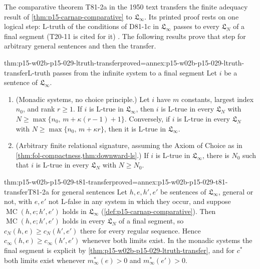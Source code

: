 The comparative theorem T81-2a in the 1950 text transfers the finite
adequacy result of \cref{thm:p15-carnap-comparative} to
\(\mathfrak L_\infty\). Its printed proof rests on one logical step:
L-truth of the conditions of D81-1c in \(\mathfrak L_\infty\) passes to
every \(\mathfrak L_N\) of a final segment (T20-11 is cited for it)
\cite[sec.~81, pp.~440--441]{Carnap1950Probability}. The following
results prove that step for arbitrary general sentences and then the
transfer.

\begin{hbtheorem}{thm:p15-w02b-p15-029-ltruth-transfer}{proved=annex:p15-w02b-p15-029-ltruth-transfer}{L-truth passes from the infinite system to a final segment}
Let \(i\) be a sentence of \(\mathfrak L_\infty\).
\begin{enumerate}
 \item (Monadic systems, no choice principle.) Let \(i\) have
       \(m\) constants, largest index \(n_0\), and rank \(r\geq1\).
       If \(i\) is L-true in \(\mathfrak L_\infty\), then \(i\) is
       L-true in every \(\mathfrak L_N\) with
       \(N\geq\max\{n_0,\,m+\kappa(r-1)+1\}\). Conversely, if
       \(i\) is L-true in every \(\mathfrak L_N\) with
       \(N\geq\max\{n_0,\,m+\kappa r\}\), then it is L-true in
       \(\mathfrak L_\infty\).
 \item (Arbitrary finite relational signature, assuming the Axiom of
       Choice as in \cref{thm:fol-compactness,thm:downward-ls}.)
       If \(i\) is L-true in \(\mathfrak L_\infty\), there is
       \(N_0\) such that \(i\) is L-true in every
       \(\mathfrak L_N\) with \(N\geq N_0\).
\end{enumerate}
\end{hbtheorem}

\begin{hbtheorem}{thm:p15-w02b-p15-029-t81-transfer}{proved=annex:p15-w02b-p15-029-t81-transfer}{T81-2a for general sentences}
Let \(h,e,h',e'\) be sentences of \(\mathfrak L_\infty\), general or
not, with \(e,e'\) not L-false in any system in which they occur, and
suppose \(\operatorname{MC}(h,e;h',e')\) holds in
\(\mathfrak L_\infty\) (\cref{def:p15-carnap-comparative}). Then
\(\operatorname{MC}(h,e;h',e')\) holds in every \(\mathfrak L_N\)
of a final segment, so \(c_N(h,e)\geq c_N(h',e')\) there for every
regular sequence. Hence
\(c_\infty(h,e)\geq c_\infty(h',e')\) whenever both limits exist.
In the monadic systems the final segment is explicit by
\cref{thm:p15-w02b-p15-029-ltruth-transfer}, and for \(c^*\) both
limits exist whenever \(m^*_\infty(e)>0\) and \(m^*_\infty(e')>0\).
\end{hbtheorem}

